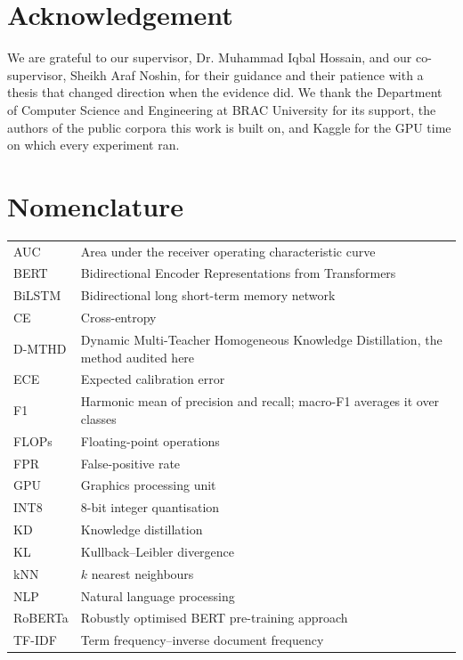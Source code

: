 \chapter*{Acknowledgement}
We are grateful to our supervisor, Dr. Muhammad Iqbal Hossain, and our co-supervisor, Sheikh Araf Noshin,
for their guidance and their patience with a thesis that changed direction when the evidence did. We
thank the Department of Computer Science and Engineering at BRAC University for its support, the authors
of the public corpora this work is built on, and Kaggle for the GPU time on which every experiment ran.

\tableofcontents
\clearpage{}
\listoffigures
\clearpage{}
\listoftables

\chapter*{Nomenclature}
\begin{tabular}{@{}lp{11.6cm}@{}}
AUC & Area under the receiver operating characteristic curve\\
BERT & Bidirectional Encoder Representations from Transformers\\
BiLSTM & Bidirectional long short-term memory network\\
CE & Cross-entropy\\
D-MTHD & Dynamic Multi-Teacher Homogeneous Knowledge Distillation, the method audited here\\
ECE & Expected calibration error\\
F1 & Harmonic mean of precision and recall; macro-F1 averages it over classes\\
FLOPs & Floating-point operations\\
FPR & False-positive rate\\
GPU & Graphics processing unit\\
INT8 & 8-bit integer quantisation\\
KD & Knowledge distillation\\
KL & Kullback--Leibler divergence\\
kNN & $k$ nearest neighbours\\
NLP & Natural language processing\\
RoBERTa & Robustly optimised BERT pre-training approach\\
TF-IDF & Term frequency--inverse document frequency\\
\end{tabular}
